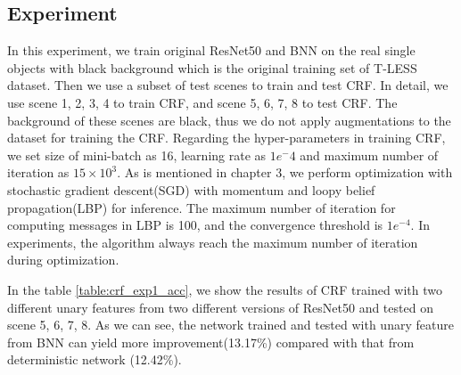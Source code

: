 \subsection{Experiment }
In this experiment, we train original ResNet50 and BNN on the real single objects with black background which is the original training set of T-LESS dataset. Then we use a subset of test scenes to train and test CRF. In detail, we use scene 1, 2, 3, 4 to train CRF, and scene 5, 6, 7, 8 to test CRF. The background of these scenes are black, thus we do not apply augmentations to the dataset for training the CRF. Regarding the hyper-parameters in training CRF, we set size of mini-batch as 16, learning rate as $1e^-4$ and maximum number of iteration as $15\times10^3$. As is mentioned in chapter 3, we perform optimization with stochastic gradient descent(SGD) with momentum and loopy belief propagation(LBP) for inference. The maximum number of iteration for computing messages in LBP is 100, and the convergence threshold is $1e^{-4}$. In experiments, the algorithm always reach the maximum number of iteration during optimization.

In the table \ref{table:crf_exp1_acc}, we show the results of CRF trained with two different unary features from two different versions of ResNet50 and tested on scene 5, 6, 7, 8. As we can see, the network trained and tested with unary feature from BNN can yield more improvement(13.17\%) compared with that from deterministic network (12.42\%).  

